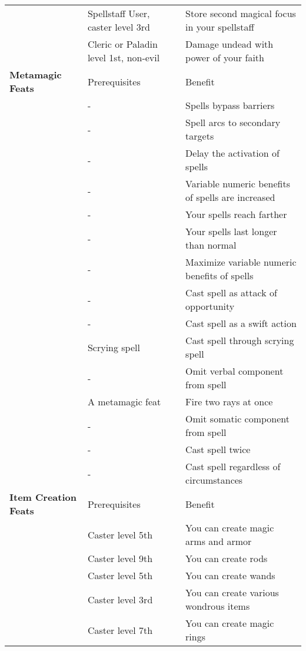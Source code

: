 \begin{table*}
{{\begin{tabular}{p{}p{}p{}}
\nameref{Feat:SpellstaffContainment}&Spellstaff User, caster level 3rd&Store second magical focus in your spellstaff\\
\nameref{Feat:TurnUndead}&Cleric or Paladin level 1st, non-evil&Damage undead with power of your faith\\
\midrule
\textbf{Metamagic Feats}&Prerequisites&Benefit\\
\midrule
\nameref{Feat:BurrowingSpell}&-&Spells bypass barriers\\
\nameref{Feat:ChainSpell}&-&Spell arcs to secondary targets\\
\nameref{Feat:DelaySpell}&-&Delay the activation of spells\\
\nameref{Feat:EmpowerSpell}&-&Variable numeric benefits of spells are increased\\
\nameref{Feat:EnlargeSpell}&-&Your spells reach farther\\
\nameref{Feat:ExtendSpell}&-&Your spells last longer than normal\\
\nameref{Feat:MaximizeSpell}&-&Maximize variable numeric benefits of spells\\
\nameref{Feat:OpportunitySpell}&-&Cast spell as attack of opportunity\\
\nameref{Feat:QuickenSpell}&-&Cast spell as a swift action\\
\nameref{Feat:ScryAndDie}&Scrying spell&Cast spell through scrying spell\\
\nameref{Feat:SilentSpell}&-&Omit verbal component from spell\\
\nameref{Feat:SplitRay}&A metamagic feat&Fire two rays at once\\
\nameref{Feat:StillSpell}&-&Omit somatic component from spell\\
\nameref{Feat:TwinSpell}&-&Cast spell twice\\
\nameref{Feat:UnconditionalSpell}&-&Cast spell regardless of circumstances\\
\midrule
\textbf{Item Creation Feats}&Prerequisites&Benefit\\
\midrule
\nameref{Feat:CraftMagicArmsAndArmor}&Caster level 5th&You can create magic arms and armor\\
\nameref{Feat:CraftRod}&Caster level 9th&You can create rods\\
\nameref{Feat:CraftWand}&Caster level 5th&You can create wands\\
\nameref{Feat:CraftWondrousItem}&Caster level 3rd&You can create various wondrous items\\
\nameref{Feat:ForgeRing}&Caster level 7th&You can create magic rings\\

\end{tabular}}}
\end{table*}
